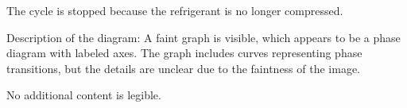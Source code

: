 The cycle is stopped because the refrigerant is no longer compressed.  

Description of the diagram:  
A faint graph is visible, which appears to be a phase diagram with labeled axes. The graph includes curves representing phase transitions, but the details are unclear due to the faintness of the image.  

No additional content is legible.